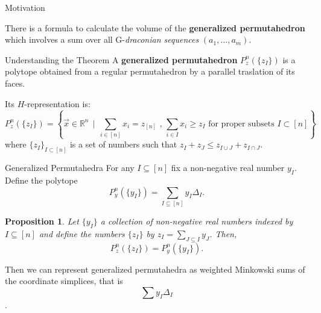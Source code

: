 \documentclass{beamer}
\newtheorem{proposition}{Proposition}[section]
\begin{document}
\begin{frame}{Motivation}
\begin{theorem}[Postnikov-2005]
There is a formula to calculate the volume of the \textbf{generalized permutahedron} which involves a sum over all G-\textit{draconian sequences} $(a_1, \dots, a_m)$.
\end{theorem}

\end{frame}



\begin{frame}{Understanding the Theorem}
    A \textbf{generalized permutahedron} $P_z^n(\{z_I\})$ is a polytope obtained from a regular permutahedron by a parallel traslation of its faces.
    
    Its $H$-representation is:
    $$P_z^n(\{z_I\}) = \left\{ \Vec{x}\in\mathbb{R}^n \, \mid \, \sum_{i\in[n]}x_i = z_{[n]} \text{ , } \sum_{i\in I}x_i \geq z_I \text{ for proper subsets }I\subset [n]\right\}$$
    where $\{z_I\}_{I\subset [n]}$ is a set of numbers such that $z_I + z_J \leq z_{I\cup J} + z_{I \cap J}$.

\end{frame}

\begin{frame}{Generalized Permutahedra}
 For any $I\subseteq [n]$ fix a non-negative real number $y_I$. 
 Define the polytope $$P_y^n(\{y_I\}) = \sum_{I\subseteq [n]}y_I\Delta_I.$$
 \begin{proposition}
 Let $\{ y_I\}$ a collection of non-negative real numbers indexed by $I \subseteq [n]$ and define the numbers $\{z_I\}$ by $z_I = \sum_{J\subseteq I}y_J$. Then,
 $$P_z^n(\{z_I\}) = P_y^n(\{y_I\}).$$
 \end{proposition}
 
Then we can represent generalized permutahedra as weighted Minkowski sums of the coordinate simplices, that is
$$\sum y_I\Delta_I$$.
\end{frame}
\end{document}
